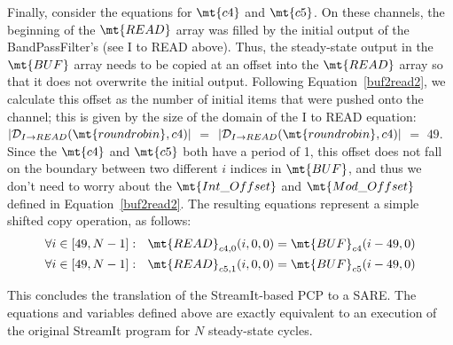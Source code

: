 Finally, consider the equations for $\mt{c4}$ and $\mt{c5}$.  On these
channels, the beginning of the $\mt{READ}$ array was filled by the
initial output of the BandPassFilter's (see I to READ above).  Thus,
the steady-state output in the $\mt{BUF}$ array needs to be copied at
an offset into the $\mt{READ}$ array so that it does not overwrite the
initial output.  Following Equation~\ref{buf2read2}, we calculate this
offset as the number of initial items that were pushed onto the
channel; this is given by the size of the domain of the I to READ
equation: $|{\cal D}_{I \rightarrow READ}(\mt{roundrobin}, c4)|$ $=$
$|{\cal D}_{I \rightarrow READ}(\mt{roundrobin}, c4)|$ $=$ $49$.
Since the $\mt{c4}$ and $\mt{c5}$ both have a period of 1, this offset
does not fall on the boundary between two different $i$ indices in
$\mt{BUF}$, and thus we don't need to worry about the
$\mt{Int\_Offset}$ and $\mt{Mod\_Offset}$ defined in
Equation~\ref{buf2read2}.  The resulting equations represent a simple
shifted copy operation, as follows:
\begin{align*}
\forall i \in [49,N-1]:~~\mt{READ}_{{c4}, 0}(i,0,0) = \mt{BUF}_{c4}(i-49,0) \\
\forall i \in [49,N-1]:~~\mt{READ}_{{c5}, 1}(i,0,0) = \mt{BUF}_{c5}(i-49,0)
\end{align*}

This concludes the translation of the StreamIt-based PCP to a SARE.
The equations and variables defined above are exactly equivalent to an
execution of the original StreamIt program for $N$ steady-state
cycles.
